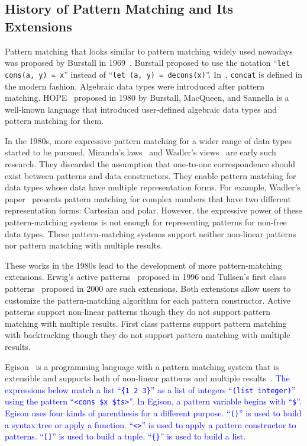 \documentclass[acmlarge]{acmart}
\newcommand{\new}[1]{\textcolor{blue}{#1}}
\begin{document}
\subsection{History of Pattern Matching and Its Extensions}\label{history1}

Pattern matching that looks similar to pattern matching widely used nowadays was proposed by Burstall in 1969~\cite{burstall1969proving}.
Burstall proposed to use the notation ``\lstinline{let cons(a, y) = x}'' instead of ``\lstinline{let (a, y) = decons(x)}''.
In~\cite{burstall1969proving}, \lstinline{concat} is defined in the modern fashion.
Algebraic data types were introduced after pattern matching.
HOPE~\cite{burstall1980hope} proposed in 1980 by Burstall, MacQueen, and Sannella is a well-known language that introduced user-defined algebraic data types and pattern matching for them.

In the 1980s, more expressive pattern matching for a wider range of data types started to be pursued.
Miranda's laws~\cite{thompson1986laws,thompson1990lawful} and Wadler's views~\cite{wadler1987views} are early such research.
They discarded the assumption that one-to-one correspondence should exist between patterns and data constructors.
They enable pattern matching for data types whose data have multiple representation forms.
For example, Wadler's paper~\cite{wadler1987views} presents pattern matching for complex numbers that have two different representation forms: Cartesian and polar.
However, the expressive power of these pattern-matching systems is not enough for representing patterns for non-free data types.
These pattern-matching systems support neither non-linear patterns nor pattern matching with multiple results.

These works in the 1980s lead to the development of more pattern-matching extensions.
Erwig's active patterns~\cite{erwig1996active} proposed in 1996 and Tullsen's first class patterns~\cite{tullsen2000first} proposed in 2000 are such extensions.
Both extensions allow users to customize the pattern-matching algorithm for each pattern constructor.
Active patterns support non-linear patterns though they do not support pattern matching with multiple results.
First class patterns support pattern matching with backtracking though they do not support pattern matching with multiple results.

Egison~\cite{egisonWeb} is a programming language with a pattern matching system that is extensible and supports both of non-linear patterns and multiple results~\cite{egi2018aplas}.
\new{
The expressions below match a list ``\texttt{\{1 2 3\}}'' as a list of integers ``\lstinline{(list integer)}'' using the pattern ``\lstinline{<cons $x $ts>}''.
In Egison, a pattern variable begins with ``\lstinline{$}''.
Egison uses four kinds of parenthesis for a different purpose.
``\lstinline{()}'' is used to build a syntax tree or apply a function.
``\lstinline{<>}'' is used to apply a pattern constructor to patterns.
``\lstinline{[]}'' is used to build a tuple.
``\texttt{\{\}}'' is used to build a list. %
}%
\end{document}

